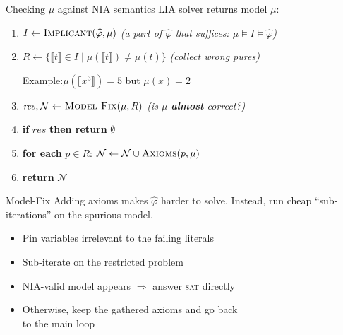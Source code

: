 \documentclass[11pt]{beamer}
\newcommand{\pure}[1]{\llbracket{#1}\rrbracket}
\begin{document}
\begin{frame}{Checking $\mu$ against NIA semantics}
	LIA solver returns model $\mu$:
	\begin{block}
		\small
		\begin{enumerate}
			\item $I\gets\textsc{Implicant}(\widehat\varphi,\mu)$
			      \hfill\emph{(a part of $\widehat\varphi$ that suffices: $\mu\models I\models\widehat\varphi$)}
			      \pause
			\item $R\gets\{\pure{t}\in I \mid \mu(\pure{t})\neq\mu(t)\}$
			      \hfill\emph{(collect wrong pures)}
			      \pause
			      \medskip
			      \begin{center}
				      Example:\quad $\mu(\pure{x^3})=5$ \quad but \quad $\mu(x)=2$
			      \end{center}
			      \medskip
			      \pause
			\item $\mathit{res},\mathcal{N}\gets\textsc{Model-Fix}(\mu,R)$
			      \hfill\emph{(is $\mu$ \textbf{almost} correct?)}
			\item \textbf{if} $\mathit{res}$ \textbf{then return} $\emptyset$
			      \pause
			\item \textbf{for each} $p\in R$:\quad
			      $\mathcal{N}\gets\mathcal{N}\cup\textsc{Axioms}(p,\mu)$
			\item \textbf{return} $\mathcal{N}$
		\end{enumerate}
	\end{block}
\end{frame}

\begin{frame}{Model-Fix}
	Adding axioms makes $\widehat\varphi$ harder to solve. Instead, run cheap
	``sub-iterations'' on the spurious model.
	\pause
	\begin{itemize}
		\item Pin variables irrelevant to the failing literals
		\item Sub-iterate on the restricted problem
		\item NIA-valid model appears $\Rightarrow$ answer \alert{\textsc{sat}} directly
		\item Otherwise, keep the gathered axioms and go back\\ to the main loop
	\end{itemize}
\end{frame}
\end{document}

